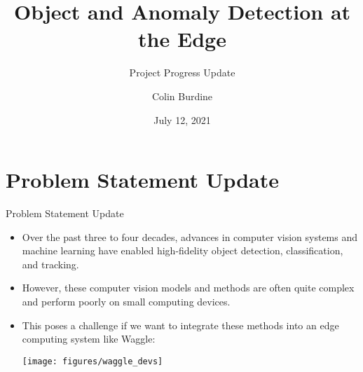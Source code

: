 \documentclass[10pt]{beamer}
\title{Object and Anomaly Detection at the Edge}
\subtitle{Project Progress Update}
\date{July 12, 2021}
\author{Colin Burdine}
\institute{SULI Intern, Hosted at Argonne National Laboratory}
\begin{document}
\maketitle


\section{Problem Statement Update}


\begin{frame}{Problem Statement Update}

\begin{itemize}
\item Over the past three to four decades, advances in computer vision systems and machine learning have enabled high-fidelity object detection, classification, and tracking.

\item However, these computer vision models and methods are often quite complex and perform poorly on small computing devices.

\pause 
\item This poses a challenge if we want to integrate these methods into an \alert{edge computing} system like Waggle:\\[4mm]
\begin{center}
\texttt{[image: figures/waggle\_devs]}
\end{center}

\end{itemize}
\end{frame}
\end{document}
